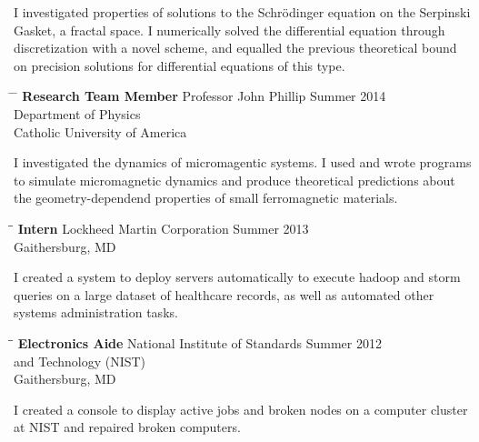\documentclass[12pt]{res}
\begin{document}
\begin{resume}
	\noindent
	I investigated properties of solutions to the Schrödinger equation on
		the Serpinski Gasket, a fractal space.
	I numerically solved the differential equation through discretization
		with a novel scheme, and equalled the previous theoretical bound
		on precision solutions for differential equations of this type.

	\vspace{5pt}
	\begin{tabbing}
		\hspace{2.3in} \= \hspace{2.6in} \= \kill
		{\bf Research Team Member} \> Professor John Phillip \> Summer 2014 \\
		\> Department of Physics\\
		\> Catholic University of America \\
	\end{tabbing} \vspace{-30pt}

	\noindent
	I investigated the dynamics of micromagentic systems.
	I used and wrote programs to simulate micromagnetic dynamics and produce
		theoretical predictions about the geometry-dependend properties
		of small ferromagnetic materials. 

    \begin{tabbing}
    \hspace{2.3in}\= \hspace{2.6in}\= \kill %
    \textbf{ Intern } \> Lockheed Martin Corporation \> Summer 2013\\
                  \> Gaithersburg, MD
    \end{tabbing}\vspace{-10pt}

	\noindent
	I created a system to deploy servers automatically to execute
    hadoop and storm queries on a large dataset of healthcare
    records, as well as automated other systems administration tasks.

    \begin{tabbing}
    \hspace{2.3in}\= \hspace{2.6in}\= \kill %
    \textbf{Electronics Aide} \> National Institute of Standards \> Summer 2012\\
						\> and Technology (NIST) \\
                           \> Gaithersburg, MD    
    \end{tabbing}\vspace{-10pt}
	\noindent
      I created a console to display active jobs and broken nodes
      on a computer cluster at NIST and repaired broken computers.


\end{resume}
\end{document}
